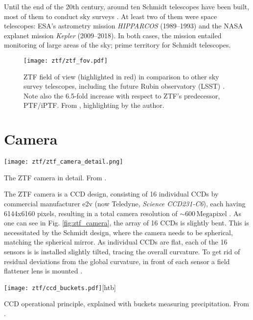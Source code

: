 Until the end of the 20th century, around ten Schmidt telescopes have been built, most of them to conduct sky surveys . At least two of them were space telescopes: ESA's astrometry mission \textit{HIPPARCOS}  (1989--1993) and the NASA explanet mission \textit{Kepler}  (2009--2018). In both cases, the mission entailed monitoring of large areas of the sky; prime territory for Schmidt telescopes.

\begin{figure}[]
    \texttt{[image: ztf/ztf\_fov.pdf]}
    \caption[ZTF Field of View]{ZTF field of view (highlighted in red) in comparison to other sky survey telescopes, including the future Rubin observatory (LSST) \cite{Ivezic2019}. Note also the 6.5-fold increase with respect to ZTF's predecessor, PTF/iPTF. From \cite{Laher2018}, highlighting by the author.}
\end{figure}



\section{Camera}
\begin{marginfigure}
    \texttt{[image: ztf/ztf\_camera\_detail.png]}
    \caption[ZTF camera cutaway]{The ZTF camera in detail. From \cite{Dekany2020}.}
\end{marginfigure}
The ZTF camera is a CCD design, consisting of 16 individual CCDs by commercial manufacturer e2v (now Teledyne, \textit{Science CCD231-C6}), each having 6144x6160 pixels, resulting in a total camera resolution of $\sim 600 \,\textrm{Megapixel}$ . As one can see in Fig. \ref{fig:ztf_camera}, the array of 16 CCDs is slightly bent. This is necessitated by the Schmidt design, where the camera needs to be spherical, matching the spherical mirror. As individual CCDs are flat, each of the 16 sensors is is installed slightly tilted, tracing the overall curvature. To get rid of residual deviations from the global curvature, in front of each sensor a field flattener lens is mounted .

\begin{marginfigure}
    \texttt{[image: ztf/ccd\_buckets.pdf]}[htb]
    \caption[CCD operational principle]{CCD operational principle, explained with buckets measuring precipitation. From \cite{Janesick1987}.}
\end{marginfigure}

